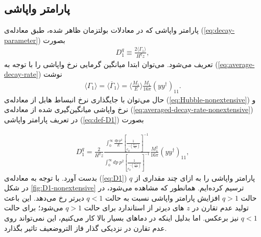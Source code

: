 \documentclass[a4paper]{book}
\begin{document}
\subsection{پارامتر واپاشی}
\label{sec:D1}
پارامتر واپاشی که در معادلات بولتزمان ظاهر شده، طبق معادله‌ی (\ref{eq:decay-parameter}) بصورت
{\footnotesize\begin{align}
	D^q_1 \equiv  \frac{2 \langle \Gamma_{1} \rangle}{H^q z},
	\label{eq:def-D1}
\end{align}}
تعریف می‌شود. می‌توان ابتدا میانگین گرمایی نرخ واپاشی را با توجه به (\ref{eq:average-decay-rate}) نوشت
{\footnotesize\begin{align}
	\langle \Gamma_{1} \rangle = \langle \overline{\Gamma}_1 \rangle =  \langle\frac{M_1}{E}\rangle \frac{M_1}{16 \pi} (yy^{\dagger})_{11}.
	\label{eq:averaged-decay-rate-nonextensive}
\end{align}}
حال می‌توان با جایگذاری نرخ انبساط هابل از معادله‌ی (\ref{eq:Hubble-nonextensive}) و نرخ واپاشی میانگین‌گیری شده از معادله‌ی (\ref{eq:averaged-decay-rate-nonextensive}) در تعریف پارامتر واپاشی (\ref{eq:def-D1}) بصورت
\par
\vspace{-0.5cm}
{\footnotesize\begin{align}
	D^q_1= \frac{2}{H^q z} \frac{\int_{0}^{\infty} \frac{dp\ p^2}{E} \left[ \frac{1}{e_q^{-(\frac{E_{N_1} z}{M_1})}}\right]^{-1}}{\int_{0}^{\infty} dp\ p^2 \left[ \frac{1}{e_q^{-(\frac{E_{N_1} z}{M_1})}}\right]^{-1}} \frac{M_1^2}{16 \pi} (yy^{\dagger})_{11},
	\label{eq:D1}
\end{align}}
بدست آورد.
با توجه به معادله‌ی (\ref{eq:D1}) پارامتر واپاشی را به ازای چند مقداری از {\footnotesize$q$} در شکل \ref{fig:D1-nonextensive} ترسیم کرده‌ایم. همانطور که مشاهده می‌شود، در حالت {\footnotesize$q>1$} افزایش پارامتر واپاشی نسبت به حالت {\footnotesize$q<1$} دیر‌تر رخ می‌دهد. این باعث تولید عدم تقارن در {\footnotesize$z$} های دیرتر از استاندارد برای حالت {\footnotesize$q>1$} می‌شود؛ برای حالت {\footnotesize$q<1$} نیز برعکس. اما بدلیل اینکه در دماهای بسیار بالا کار می‌کنیم، این نمی‌تواند روی عدم تقارن در نزدیکی گذار فاز التروضعیف تاثیر بگذارد.
\end{document}
